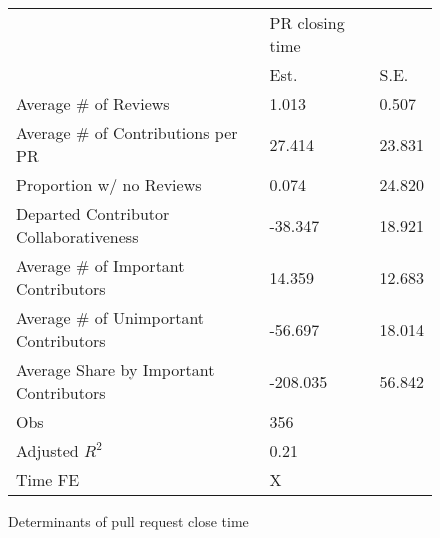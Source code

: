 \begin{figure}[!htbp]
\centering
{\small
\begin{tabular}{lll}
\hline
& PR closing time &  \\ \cmidrule(lr){2-3}
& Est. & S.E. \\ \hline
Average # of Reviews & 1.013 & 0.507 \\
Average # of Contributions per PR & 27.414 & 23.831 \\
Proportion w/ no Reviews & 0.074 & 24.820 \\
Departed Contributor Collaborativeness & -38.347 & 18.921 \\
Average # of Important Contributors & 14.359 & 12.683 \\
Average # of Unimportant Contributors & -56.697 & 18.014 \\
Average Share by Important Contributors & -208.035 & 56.842 \\
\hdashline
Obs & 356 & \\
Adjusted $R^2$ & 0.21 & \\
Time FE & X &  \\
\hline
\end{tabular}
}
\caption{Determinants of pull request close time}
\label{fig:close_time_regression}
\end{figure}


